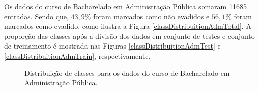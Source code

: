 Os dados do curso de Bacharelado em Administração Pública somaram 11685
entradas. Sendo que, $43,9\%$ foram marcados como não evadidos e $56,1\%$ foram
marcados como evadido, como ilustra a Figura \ref{classDistribuitionAdmTotal}. A
proporção das classes após a divisão dos dados em conjunto de testes e conjunto
de treinamento é mostrada nas Figuras \ref{classDistribuitionAdmTest} e
\ref{classDistribuitionAdmTrain}, respectivamente.

\begin{figure}[!htb]
  \centering
  \caption{\label{classDistribuitionAdm} Distribuição de classes para os dados do curso de Bacharelado em Administração Pública.}
  \qquad
  \qquad

\end{figure}
